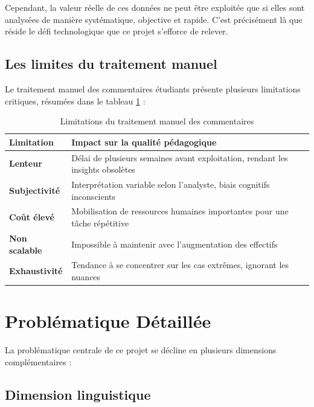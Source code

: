 Cependant, la valeur réelle de ces données ne peut être exploitée que si
elles sont analysées de manière systématique, objective et rapide. C'est
précisément là que réside le défi technologique que ce projet s'efforce
de relever.

\subsection{Les limites du traitement manuel}

Le traitement manuel des commentaires étudiants présente plusieurs
limitations critiques, résumées dans le tableau \ref{tab:limites_manuel} :

\begin{table}[H]
\centering
\caption{Limitations du traitement manuel des commentaires}
\label{tab:limites_manuel}
\renewcommand{\arraystretch}{1.4}
\begin{tabular}{>{\bfseries}p{3.5cm} p{9cm}}
\toprule
\rowcolor{bleuprincipal!15}
\textbf{Limitation} & \textbf{Impact sur la qualité pédagogique} \\
\midrule
Lenteur & Délai de plusieurs semaines avant exploitation, rendant les insights obsolètes \\
\midrule
\rowcolor{gray!8}
Subjectivité & Interprétation variable selon l'analyste, biais cognitifs inconscients \\
\midrule
Coût élevé & Mobilisation de ressources humaines importantes pour une tâche répétitive \\
\midrule
\rowcolor{gray!8}
Non scalable & Impossible à maintenir avec l'augmentation des effectifs \\
\midrule
Exhaustivité & Tendance à se concentrer sur les cas extrêmes, ignorant les nuances \\
\bottomrule
\end{tabular}
\end{table}

\section{Problématique Détaillée}

La problématique centrale de ce projet se décline en plusieurs dimensions
complémentaires :

\subsection{Dimension linguistique}

